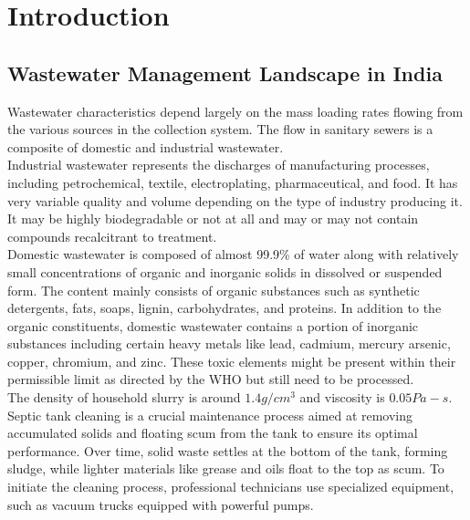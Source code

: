 \documentclass[a4,10pt]{report}
\begin{document}
\newpage

\tableofcontents


\newpage


\chapter{Introduction}

\section{Wastewater Management Landscape in India}

Wastewater characteristics depend largely on the mass loading rates flowing from the various sources in the collection system. The flow in sanitary sewers is a composite of domestic and industrial wastewater. \\
Industrial wastewater represents the discharges of manufacturing processes, including petrochemical, textile, electroplating, pharmaceutical, and food. It has very variable quality and volume depending on the type of industry producing it. It may be highly biodegradable or not at all and may or may not contain compounds recalcitrant to treatment. 
\vspace{2mm} \\
Domestic wastewater is composed of almost 99.9\% of water along with relatively small concentrations of organic and inorganic solids in dissolved or suspended form. The content mainly consists of organic substances such as synthetic detergents, fats, soaps, lignin, carbohydrates, and proteins. In addition to the organic constituents, domestic wastewater contains a portion of inorganic substances including certain heavy metals like lead, cadmium, mercury arsenic, copper, chromium, and zinc. These toxic elements might be present within their permissible limit as directed by the WHO but still need to be processed. 
\vspace{2mm} \\
The density of household slurry is around $1.4 g/cm^3$ and viscosity is $0.05 Pa-s$. \cite{THOTARADHAKRISHNAN2018235} 
\vspace{2mm} \\
Septic tank cleaning is a crucial maintenance process aimed at removing accumulated solids and floating scum from the tank to ensure its optimal performance. Over time, solid waste settles at the bottom of the tank, forming sludge, while lighter materials like grease and oils float to the top as scum. To initiate the cleaning process, professional technicians use specialized equipment, such as vacuum trucks equipped with powerful pumps. \\
\end{document}
